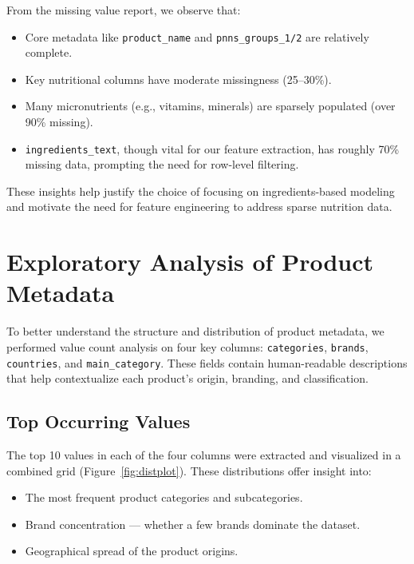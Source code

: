 \documentclass[11pt]{article}
\begin{document}
From the missing value report, we observe that:

\begin{itemize}
    \item Core metadata like \texttt{product\_name} and \texttt{pnns\_groups\_1/2} are relatively complete.
    \item Key nutritional columns have moderate missingness (25--30\%).
    \item Many micronutrients (e.g., vitamins, minerals) are sparsely populated (over 90\% missing).
    \item \texttt{ingredients\_text}, though vital for our feature extraction, has roughly 70\% missing data, prompting the need for row-level filtering.
\end{itemize}

These insights help justify the choice of focusing on ingredients-based modeling and motivate the need for feature engineering to address sparse nutrition data.

\section{Exploratory Analysis of Product Metadata}

To better understand the structure and distribution of product metadata, we performed value count analysis on four key columns: \texttt{categories}, \texttt{brands}, \texttt{countries}, and \texttt{main\_category}. These fields contain human-readable descriptions that help contextualize each product's origin, branding, and classification.

\subsection{Top Occurring Values}

The top 10 values in each of the four columns were extracted and visualized in a combined grid (Figure~\ref{fig:distplot}). These distributions offer insight into:

\begin{itemize}
    \item The most frequent product categories and subcategories.
    \item Brand concentration — whether a few brands dominate the dataset.
    \item Geographical spread of the product origins.
\end{itemize}
\end{document}

